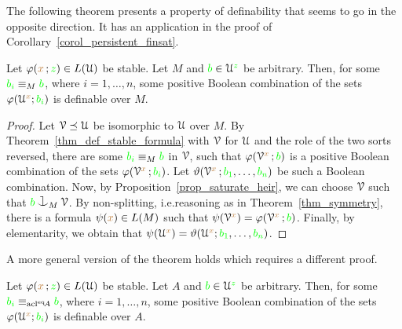 
The following theorem presents a property of definability that seems to go in the opposite direction.
It has an application in the proof of Corollary~\ref{corol_persistent_finsat}.

\begin{theorem}\label{thm_stability_definable_rovescio1}
  Let $\varphi({\color{brown} x}\,;{\color{green} z})\in L(\EuScript U)$ be stable.
  Let $M$ and ${\color{green} b}\in\EuScript U^{\color{green} z}$ be arbitrary.
  Then, for some ${\color{green} b_i}\equiv_M{\color{green} b}$, where $i=1,\dots,n$, some positive Boolean combination of the sets $\varphi(\EuScript U^{\color{brown} x};{\color{green} b_i})$ is definable over $M$.
\end{theorem}

\begin{proof}
  Let $\EuScript V\preceq\EuScript U$ be isomorphic to $\EuScript U$ over $M$.
  By Theorem~\ref{thm_def_stable_formula} with $\EuScript V$ for $\EuScript U$ and the role of the two sorts reversed, there are  some  ${\color{green} b_i}\equiv_M{\color{green} b}$ in $\EuScript V$, such that $\varphi(\EuScript V^{\color{brown} x}\,;{\color{green} b})$ is a positive Boolean combination of the sets $\varphi(\EuScript V^{\color{brown} x}\,;{\color{green} b_i})$.
  Let $\vartheta(\EuScript V^{\color{brown} x}\,;{\color{green} b_1},\dots,{\color{green} b_n})$ be such a Boolean combination.
  Now, by Proposition~\ref{prop_saturate_heir}, we can choose $\EuScript V$ such that ${\gr b}\cnonfork_M\V$.
  By non-splitting, i.e.\@ reasoning as in Theorem~\ref{thm_symmetry}, there is a formula $\psi({\color{brown} x})\in L(M)$ such that $\psi(\EuScript V^{\color{brown} x})=\varphi(\EuScript V^{\color{brown} x}\,;{\color{green} b})$.
  Finally, by elementarity, we obtain that $\psi(\EuScript U^{\color{brown} x})=\vartheta(\EuScript U^{\color{brown} x};{\color{green} b_1},\dots,{\color{green} b_n})$.
\end{proof}

A more general version of the theorem holds which requires a different proof.

\begin{theorem}\label{thm_stability_definable_rovescio2}
  Let $\varphi({\color{brown} x}\,;{\color{green} z})\in L(\EuScript U)$ be stable.
  Let $A$ and ${\color{green} b}\in\EuScript U^{\color{green} z}$ be arbitrary.
  Then, for some ${\color{green} b_i}\equiv_{{\rm acl}^{{\rm eq}}\!A}{\color{green} b}$, where $i=1,\dots,n$, some positive Boolean combination of the sets $\varphi(\EuScript U^{\color{brown} x};{\color{green} b_i})$ is definable over $A$.
\end{theorem}

